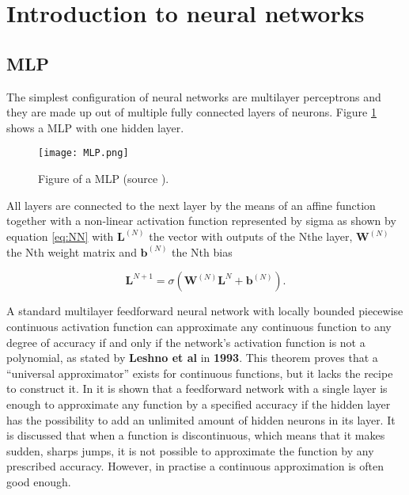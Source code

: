 \section{Introduction to neural networks}\label{s:Introduction to neural networks}
\subsection{MLP}
The simplest configuration of neural networks are multilayer perceptrons and they are made up out of multiple fully connected layers of neurons. Figure \ref{fig:MLP} shows a MLP with one hidden layer.

\begin{figure}[h!]
	\centering
	\texttt{[image: MLP.png]}
	\caption{Figure of a MLP (source \cite{Czum2020}).}
	\label{fig:MLP}
\end{figure}

All layers are connected to the next layer by the means of an affine function together with a non-linear activation function represented by sigma as shown by equation \ref{eq:NN} with $ \textbf{L}^{(N)} $ the vector with outputs of the Nthe layer, $ \textbf{W}^(N) $ the Nth weight matrix and $ \textbf{b}^{(N)} $ the Nth bias


\begin{equation}\label{eq:NN}
	\textbf{L}^{N+1} = \sigma(\textbf{W}^{(N)}\textbf{L}^{N}+\textbf{b}^{(N)}).
\end{equation}

A  standard multilayer feedforward neural network with locally bounded piecewise continuous activation function can approximate any continuous function to any degree of accuracy if and only if the network's activation function is not a polynomial, as stated by \textbf{Leshno et al} in \textbf{1993}. This theorem proves that a ``universal approximator'' exists for continuous functions, but it lacks the recipe to construct it. In \cite{Nielsen2015} it is shown that a feedforward network with a single layer is enough to approximate any function by a specified accuracy if the hidden layer has the possibility to add an unlimited amount of hidden neurons in its layer. It is discussed that when a function is discontinuous, which means that it makes sudden, sharps jumps, it is not possible to approximate the function by any prescribed accuracy. However, in practise a continuous approximation is often good enough.\\

